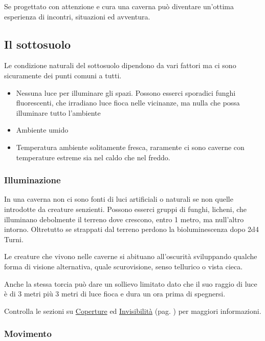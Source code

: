 \begin{multicols}{2}
Se progettato con attenzione e cura una caverna può diventare un'ottima esperienza di incontri, situazioni ed avventura.

\subsection{Il sottosuolo}

Le condizione naturali del sottosuolo dipendono da vari fattori ma ci sono sicuramente dei punti comuni a tutti.

\begin{itemize}[leftmargin=*] \setlength{\itemsep}{0pt}
\item Nessuna luce per illuminare gli spazi. Possono esserci sporadici funghi fluorescenti, che irradiano luce fioca nelle vicinanze, ma nulla che possa illuminare tutto l'ambiente
\item Ambiente umido
\item Temperatura ambiente solitamente fresca, raramente ci sono caverne con temperature estreme sia nel caldo che nel freddo.
\end{itemize}

\subsubsection{Illuminazione}

In una caverna non ci sono fonti di luci artificiali o naturali se non quelle introdotte da creature senzienti. Possono esserci gruppi di funghi, licheni, che illuminano debolmente il terreno dove crescono, entro 1 metro, ma null'altro intorno.
Oltretutto se strappati dal terreno perdono la bioluminescenza dopo 2d4 Turni.

Le creature che vivono nelle caverne si abituano all'oscurità sviluppando qualche forma di visione alternativa, quale scurovisione, senso tellurico o vista cieca.

Anche la stessa torcia può dare un sollievo limitato dato che il suo raggio di luce è di 3 metri più 3 metri di luce fioca e dura un ora prima di spegnersi.

Controlla le sezioni su \hyperlink{copertura}{Coperture} ed \hyperlink{invisibilita}{Invisibilità} (pag. \pageref{invisibilita}) per maggiori informazioni.

\subsubsection{Movimento}


\end{multicols}
